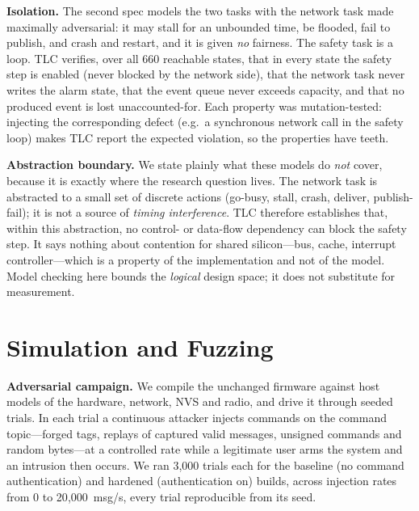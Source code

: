 \textbf{Isolation.} The second spec models the two tasks with the network task made maximally
adversarial: it may stall for an unbounded time, be flooded, fail to publish, and crash and
restart, and it is given \emph{no} fairness. The safety task is a loop. TLC verifies, over all
660 reachable states, that in every state the safety step is enabled (never blocked by the
network side), that the network task never writes the alarm state, that the event queue never
exceeds capacity, and that no produced event is lost unaccounted-for. Each property was
mutation-tested: injecting the corresponding defect (e.g.\ a synchronous network call in the
safety loop) makes TLC report the expected violation, so the properties have teeth.

\textbf{Abstraction boundary.} We state plainly what these models do \emph{not} cover, because
it is exactly where the research question lives. The network task is abstracted to a small set
of discrete actions (go-busy, stall, crash, deliver, publish-fail); it is not a source of
\emph{timing interference}. TLC therefore establishes that, within this abstraction, no
control- or data-flow dependency can block the safety step. It says nothing about contention
for shared silicon---bus, cache, interrupt controller---which is a property of the
implementation and not of the model. Model checking here bounds the \emph{logical} design
space; it does not substitute for measurement.

\section{Simulation and Fuzzing}\label{sec:sim}
\textbf{Adversarial campaign.} We compile the unchanged firmware against host models of the
hardware, network, NVS and radio, and drive it through seeded trials. In each trial a
continuous attacker injects commands on the command topic---forged tags, replays of captured
valid messages, unsigned commands and random bytes---at a controlled rate while a legitimate
user arms the system and an intrusion then occurs. We ran 3{,}000 trials each for the baseline
(no command authentication) and hardened (authentication on) builds, across injection rates
from 0 to 20{,}000~msg/s, every trial reproducible from its seed.

